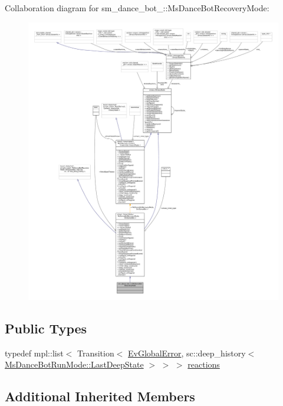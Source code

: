 Collaboration diagram for sm\+\_\+dance\+\_\+bot\+\_\+:\+:Ms\+Dance\+Bot\+Recovery\+Mode\+:
\nopagebreak
\begin{figure}[H]
\begin{center}
\leavevmode
\includegraphics[width=350pt]{classsm__dance__bot__2_1_1MsDanceBotRecoveryMode__coll__graph}
\end{center}
\end{figure}
\subsection*{Public Types}
\begin{DoxyCompactItemize}
\item 
typedef mpl\+::list$<$ Transition$<$ \hyperlink{structsm__dance__bot__2_1_1EvGlobalError}{Ev\+Global\+Error}, sc\+::deep\+\_\+history$<$ \hyperlink{classsmacc_1_1SmaccState_a60088405d2d99d468caa0baa3b2830a8}{Ms\+Dance\+Bot\+Run\+Mode\+::\+Last\+Deep\+State} $>$ $>$ $>$ \hyperlink{classsm__dance__bot__2_1_1MsDanceBotRecoveryMode_a84f4a67688a4c5e1469bd1ced648cf53}{reactions}
\end{DoxyCompactItemize}
\subsection*{Additional Inherited Members}


